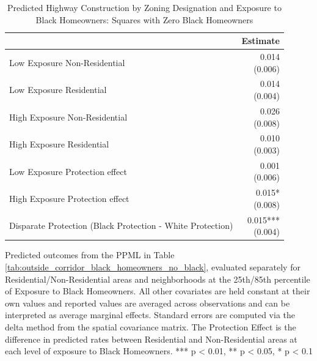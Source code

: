 \begin{table}[h]
\centering
\caption{Predicted Highway Construction by Zoning Designation and Exposure to Black Homeowners: Squares with Zero Black Homeowners}
\label{tab:predicted_outcomes_black_homeowners_no_black}
\begin{threeparttable}
\begin{tabular*}{0.6\textwidth}{@{\extracolsep{\fill}}l*{1}{r}}
\toprule
 & Estimate \\
\midrule
Low Exposure Non-Residential & \makecell[tr]{0.014 \\ (0.006)} \\
Low Exposure Residential & \makecell[tr]{0.014 \\ (0.004)} \\
High Exposure Non-Residential & \makecell[tr]{0.026 \\ (0.008)} \\
High Exposure Residential & \makecell[tr]{0.010 \\ (0.003)} \\
Low Exposure Protection effect & \makecell[tr]{0.001 \\ (0.006)} \\
High Exposure Protection effect & \makecell[tr]{0.015{*} \\ (0.008)} \\
Disparate Protection (Black Protection - White Protection) & \makecell[tr]{0.015{***} \\ (0.004)} \\
\bottomrule
\end{tabular*}
\begin{tablenotes}[flushleft]
\footnotesize
\item Predicted outcomes from the PPML in Table \ref{tab:outside_corridor_black_homeowners_no_black}, evaluated separately for Residential/Non-Residential areas and neighborhoods at the 25th/85th percentile of Exposure to Black Homeowners. All other covariates are held constant at their own values and reported values are averaged across observations and can be interpreted as average marginal effects. Standard errors are computed via the delta method from the spatial covariance matrix. The Protection Effect is the difference in predicted rates between Residential and Non-Residential areas at each level of exposure to Black Homeowners. *** p < 0.01, ** p < 0.05, * p < 0.1
\end{tablenotes}
\end{threeparttable}
\end{table}

